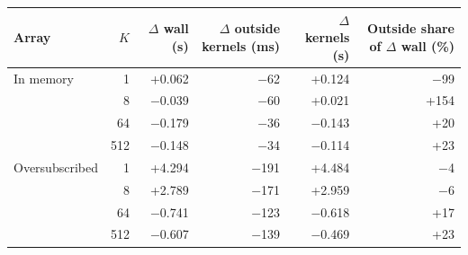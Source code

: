 \begin{tabular}{@{}lrrrrr@{}}
\toprule
Array & $K$ & $\Delta$ wall (s) & $\Delta$ outside kernels (ms) & $\Delta$ kernels (s) & Outside share of $\Delta$ wall (\%) \\
\midrule
In memory & 1 & +0.062 & $-$62 & +0.124 & $-$99 \\ %
 & 8 & $-$0.039 & $-$60 & +0.021 & +154 \\ %
 & 64 & $-$0.179 & $-$36 & $-$0.143 & +20 \\ %
 & 512 & $-$0.148 & $-$34 & $-$0.114 & +23 \\ %
\midrule
Oversubscribed & 1 & +4.294 & $-$191 & +4.484 & $-$4 \\ %
 & 8 & +2.789 & $-$171 & +2.959 & $-$6 \\ %
 & 64 & $-$0.741 & $-$123 & $-$0.618 & +17 \\ %
 & 512 & $-$0.607 & $-$139 & $-$0.469 & +23 \\ %
\bottomrule
\end{tabular}

